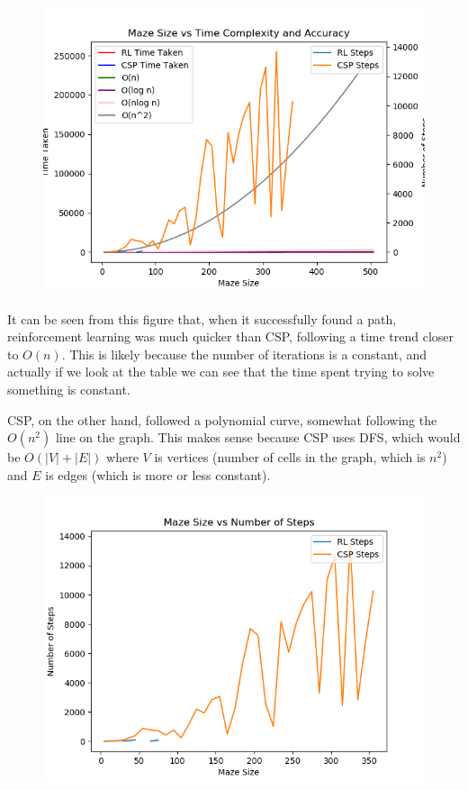 \documentclass{article}
\newcommand\tab[1][1cm]{\hspace*{#1}}
\begin{document}
        \begin{figure}[h]
            \centering
            \includegraphics[scale=0.6]{assets/TimeAndSteps.png}
            \label{TimeAndSteps}
        \end{figure}

         \tab It can be seen from this figure that, when it successfully found a 
         path, reinforcement learning was much quicker than CSP, following a 
         time trend closer to $O(n)$. This is likely because the number of
         iterations is a constant, and actually if we look at the table we can
         see that the time spent trying to solve something is constant. 

         \tab CSP, on the other hand, followed a polynomial curve, somewhat 
         following the $O(n^2)$ line on the graph. This makes sense because CSP 
         uses DFS, which would be $O(|V|+|E|)$ where $V$ is vertices (number 
         of cells in the graph, which is $n^2$) and $E$ is edges (which is 
         more or less constant).

        \begin{figure}[h]
            \centering
            \includegraphics[scale=0.6]{assets/StepsOnly.png}
            \label{StepsOnly}
        \end{figure}
\end{document}
